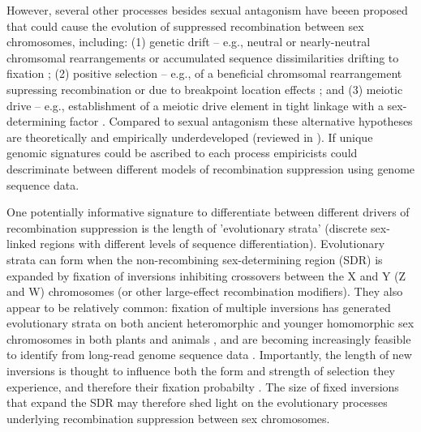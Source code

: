 \documentclass{article}
\begin{document}
However, several other processes besides sexual antagonism have beeen proposed that could cause the evolution of suppressed recombination between sex chromosomes, including: (1) genetic drift -- e.g., neutral or nearly-neutral chromsomal rearrangements or accumulated sequence dissimilarities drifting to fixation \citep{CharlesworthMarais2005}; (2) positive selection -- e.g., of a beneficial chromsomal rearrangement supressing recombination \citep{Haldane1957} or due to breakpoint location effects \citep{CorbettDetig2016}; and (3) meiotic drive -- e.g., establishment of a meiotic drive element in tight linkage with a sex-determining factor \citep{UbedaPatten2010}. Compared to sexual antagonism these alternative hypotheses are theoretically and empirically underdeveloped (reviewed in \citealt{Ironside2010, Ponnikas2018}). If unique genomic signatures could be ascribed to each process empiricists could descriminate between different models of recombination suppression using genome sequence data. 

One potentially informative signature to differentiate between different drivers of recombination suppression is the length of 'evolutionary strata' (discrete sex-linked regions with different levels of sequence differentiation). Evolutionary strata can form when the non-recombining sex-determining region (SDR) is expanded by fixation of inversions inhibiting crossovers between the X and Y (Z and W) chromosomes (or other large-effect recombination modifiers). They also appear to be relatively common: fixation of multiple inversions has generated evolutionary strata on both ancient heteromorphic and younger homomorphic sex chromosomes in both plants and animals \citep{LahnPage1999,Handley2004, Wang2012}, and are becoming increasingly feasible to identify from long-read genome sequence data \citep{WellenreutherBernatchez2018}. Importantly, the length of new inversions is thought to influence both the form and strength of selection they experience, and therefore their fixation probabilty \citep{vanValenLevins1968, KrimbasPowell1992}. The size of fixed inversions that expand the SDR may therefore shed light on the evolutionary processes underlying recombination suppression between sex chromosomes. 
\end{document}
